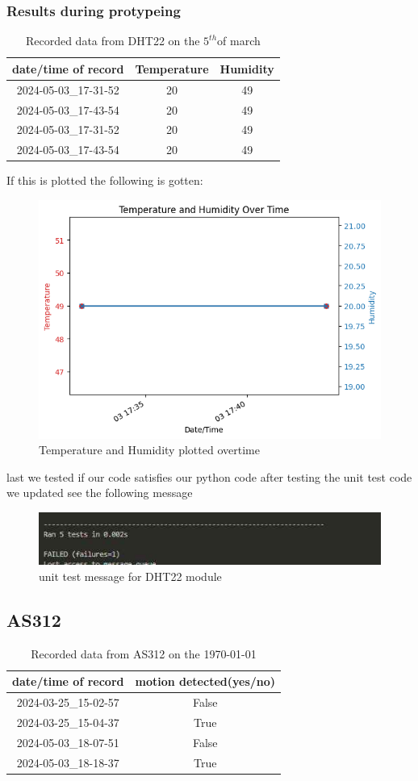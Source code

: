\subsubsection{Results during protypeing}
\begin{table}[h!]
    \centering
    \begin{tabular}{|c|c|c|}
        \hline
        date/time of record & Temperature &Humidity \\
        \hline\hline
        2024-05-03_17-31-52&20&49\\
        2024-05-03_17-43-54&20&49\\
        2024-05-03_17-31-52&20&49\\
        2024-05-03_17-43-54&20&49
        \hline
    \end{tabular}
    \caption{Recorded data from  DHT22 on the $5^{th}$of march}
    \label{Recorded data from  DHT22 on the 5th of march}
\end{table}
If this is  plotted the following is gotten:
\begin{figure}[h!]
    \centering
    \includegraphics[width=0.5\linewidth]{Images/temp_and_humidity_over_time.png}
    \caption{Temperature and Humidity plotted overtime}
    \label{Temperature and Humidity plotted overtime}
\end{figure} 
last we tested if our code  satisfies our  python code after testing the unit test code we updated see the following message
\begin{figure}[h!]
    \centering
    \includegraphics[width=0.5\linewidth]{Images/unit_testoutput.jpg}
    \caption{unit test message for DHT22 module}
    \label{unit test message for DHT22 module}
\end{figure}
\newpage
\subsection{AS312}
\begin{table}[h!]
    \centering
    \begin{tabular}{|c|c|}
        \hline
        date/time of record & motion detected(yes/no)\\
        \hline \hline
        2024-03-25_15-02-57&False \\
        2024-03-25_15-04-37&True\\
        2024-05-03_18-07-51&False\\
        2024-05-03_18-18-37&True
        \hline
    \end{tabular}
    \caption{Recorded data from  AS312 on the \today}
    \label{Recorded data from  AS312 on the \today}
\end{table}

